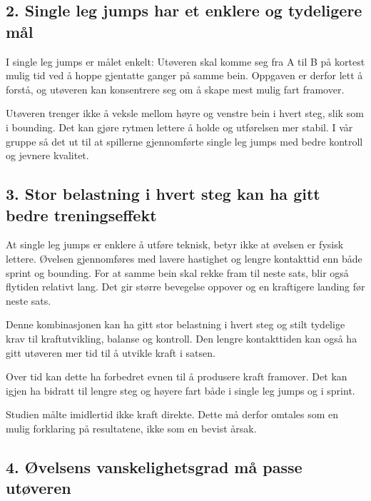 \subsection{2. Single leg jumps har et enklere og tydeligere mål}\label{single-leg-jumps-har-et-enklere-og-tydeligere-muxe5l}

I single leg jumps er målet enkelt: Utøveren skal komme seg fra A til B på kortest mulig tid ved å hoppe gjentatte ganger på samme bein. Oppgaven er derfor lett å forstå, og utøveren kan konsentrere seg om å skape mest mulig fart framover.

Utøveren trenger ikke å veksle mellom høyre og venstre bein i hvert steg, slik som i bounding. Det kan gjøre rytmen lettere å holde og utførelsen mer stabil. I vår gruppe så det ut til at spillerne gjennomførte single leg jumps med bedre kontroll og jevnere kvalitet.

\subsection{3. Stor belastning i hvert steg kan ha gitt bedre treningseffekt}\label{stor-belastning-i-hvert-steg-kan-ha-gitt-bedre-treningseffekt}

At single leg jumps er enklere å utføre teknisk, betyr ikke at øvelsen er fysisk lettere. Øvelsen gjennomføres med lavere hastighet og lengre kontakttid enn både sprint og bounding. For at samme bein skal rekke fram til neste sats, blir også flytiden relativt lang. Det gir større bevegelse oppover og en kraftigere landing før neste sats.

Denne kombinasjonen kan ha gitt stor belastning i hvert steg og stilt tydelige krav til kraftutvikling, balanse og kontroll. Den lengre kontakttiden kan også ha gitt utøveren mer tid til å utvikle kraft i satsen.

Over tid kan dette ha forbedret evnen til å produsere kraft framover. Det kan igjen ha bidratt til lengre steg og høyere fart både i single leg jumps og i sprint.

Studien målte imidlertid ikke kraft direkte. Dette må derfor omtales som en mulig forklaring på resultatene, ikke som en bevist årsak.

\subsection{4. Øvelsens vanskelighetsgrad må passe utøveren}\label{uxf8velsens-vanskelighetsgrad-muxe5-passe-utuxf8veren}

